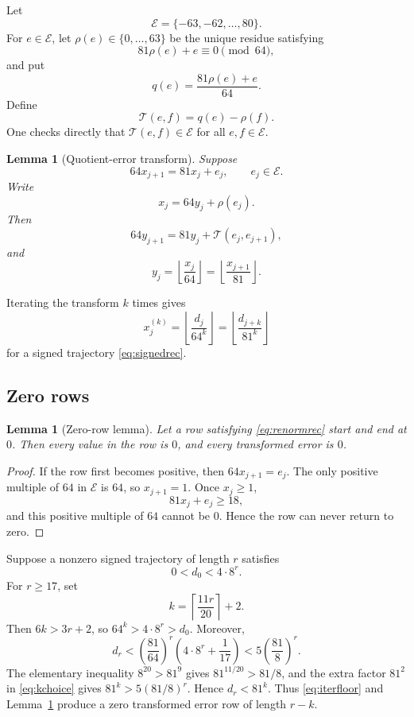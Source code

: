 \documentclass[11pt,reqno]{amsart}
\numberwithin{equation}{section}
\newtheorem{lemma}[theorem]{Lemma}
\theoremstyle{definition}
\theoremstyle{remark}
\newcommand{\cT}{\mathcal T}
\newcommand{\cE}{\mathcal E}
\begin{document}
Let
\[
 \cE=\{-63,-62,\ldots,80\}.
\]
For $e\in\cE$, let $\rho(e)\in\{0,\ldots,63\}$ be the unique residue satisfying
\[
 81\rho(e)+e\equiv0\pmod{64},
\]
and put
\[
 q(e)=\frac{81\rho(e)+e}{64}.
\]
Define
\begin{equation}\label{eq:Ttransform}
 \cT(e,f)=q(e)-\rho(f).
\end{equation}
One checks directly that $\cT(e,f)\in\cE$ for all $e,f\in\cE$.

\begin{lemma}[Quotient-error transform]\label{lem:quotient}
Suppose
\[
 64x_{j+1}=81x_j+e_j,
 \qquad e_j\in\cE.
\]
Write
\[
 x_j=64y_j+\rho(e_j).
\]
Then
\begin{equation}\label{eq:renormrec}
 64y_{j+1}=81y_j+\cT(e_j,e_{j+1}),
\end{equation}
and
\begin{equation}\label{eq:flooridentity}
 y_j=\left\lfloor\frac{x_j}{64}\right\rfloor
 =\left\lfloor\frac{x_{j+1}}{81}\right\rfloor.
\end{equation}
\end{lemma}

Iterating the transform $k$ times gives
\begin{equation}\label{eq:iterfloor}
 x_j^{(k)}
 =\left\lfloor\frac{d_j}{64^k}\right\rfloor
 =\left\lfloor\frac{d_{j+k}}{81^k}\right\rfloor
\end{equation}
for a signed trajectory \eqref{eq:signedrec}.

\subsection{Zero rows}

\begin{lemma}[Zero-row lemma]\label{lem:zerorow}
Let a row satisfying \eqref{eq:renormrec} start and end at $0$.  Then every value in the row is $0$, and every transformed error is $0$.
\end{lemma}

\begin{proof}
If the row first becomes positive, then $64x_{j+1}=e_j$.  The only positive multiple of $64$ in $\cE$ is $64$, so $x_{j+1}=1$.  Once $x_j\ge1$,
\[
 81x_j+e_j\ge18,
\]
and this positive multiple of $64$ cannot be $0$.  Hence the row can never return to zero.
\end{proof}

Suppose a nonzero signed trajectory of length $r$ satisfies
\begin{equation}\label{eq:smallcode}
 0<d_0<4\cdot8^r.
\end{equation}
For $r\ge17$, set
\begin{equation}\label{eq:kchoice}
 k=\left\lceil\frac{11r}{20}\right\rceil+2.
\end{equation}
Then $6k>3r+2$, so $64^k>4\cdot8^r>d_0$.  Moreover,
\[
 d_r<\left(\frac{81}{64}\right)^r
 \left(4\cdot8^r+\frac1{17}\right)
 <5\left(\frac{81}{8}\right)^r.
\]
The elementary inequality $8^{20}>81^9$ gives
$81^{11/20}>81/8$, and the extra factor $81^2$ in
\eqref{eq:kchoice} gives $81^k>5(81/8)^r$.  Hence $d_r<81^k$.
Thus \eqref{eq:iterfloor} and Lemma~\ref{lem:zerorow} produce a zero transformed error row of length $r-k$.
\end{document}
